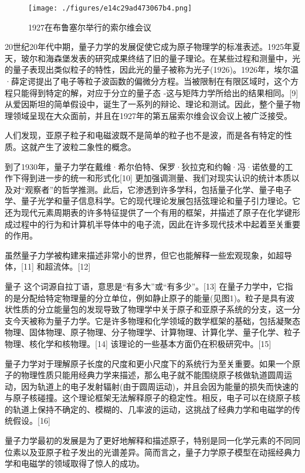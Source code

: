 \begin{figure}[ht]
\centering
\texttt{[image: ./figures/e14c29ad473067b4.png]}
\caption{1927在布鲁塞尔举行的索尔维会议} \label{fig_LZLX_2}
\end{figure}

20世纪20年代中期，量子力学的发展促使它成为原子物理学的标准表述。1925年夏天，玻尔和海森堡发表的研究成果终结了旧的量子理论。在某些过程和测量中，光的量子表现出类似粒子的特性，因此光的量子被称为光子(1926)。1926年，埃尔温·薛定谔提出了电子等粒子波函数的偏微分方程。当被限制在有限区域时，这个方程只能得到特定的解，对应于分立的量子态 -这与矩阵力学所给出的结果相同。[9] 从爱因斯坦的简单假设中，诞生了一系列的辩论、理论和测试。因此，整个量子物理领域呈现在大众面前，并且在1927年的第五届索尔维会议会议上被广泛接受。

人们发现，亚原子粒子和电磁波既不是简单的粒子也不是波，而是各有特定的性质。这就产生了波粒二象性的概念。

到了1930年，量子力学在戴维·希尔伯特、保罗·狄拉克和约翰·冯·诺依曼的工作下得到进一步的统一和形式化[10] 更加强调测量、我们对现实认识的统计本质以及对“观察者”的哲学推测。此后，它渗透到许多学科，包括量子化学、量子电子学、量子光学和量子信息科学。它的现代理论发展包括弦理论和量子引力理论。它还为现代元素周期表的许多特征提供了一个有用的框架，并描述了原子在化学键形成过程中的行为和计算机半导体中的电子流，因此在许多现代技术中起着至关重要的作用。

虽然量子力学被构建来描述非常小的世界，但它也能解释一些宏观现象，如超导体，[11] 和超流体。[12]

量子 这个词源自拉丁语，意思是“有多大”或“有多少”。[13] 在量子力学中，它指的是分配给特定物理量的分立单位，例如静止原子的能量(见图1)。粒子是具有波状性质的分立能量包的发现导致了物理学中关于原子和亚原子系统的分支，这一分支今天被称为量子力学。它是许多物理和化学领域的数学框架的基础，包括凝聚态物理、固体物理、原子物理、分子物理学、计算物理、计算化学、量子化学、粒子物理、核化学和核物理。[14] 该理论的一些基本方面仍在积极研究中。[15]

量子力学对于理解原子长度的尺度和更小尺度下的系统行为至关重要。如果一个原子的物理性质只能用经典力学来描述，那么电子就不能围绕原子核做轨道圆周运动，因为轨道上的电子发射辐射(由于圆周运动)，并且会因为能量的损失而快速的与原子核碰撞。这个理论框架无法解释原子的稳定性。相反，电子可以在绕原子核的轨道上保持不确定的、模糊的、几率波的运动，这挑战了经典力学和电磁学的传统假设。[16]

量子力学最初的发展是为了更好地解释和描述原子，特别是同一化学元素的不同同位素以及亚原子粒子发出的光谱差异。简而言之，量子力学原子模型在动摇经典力学和电磁学的领域取得了惊人的成功。


